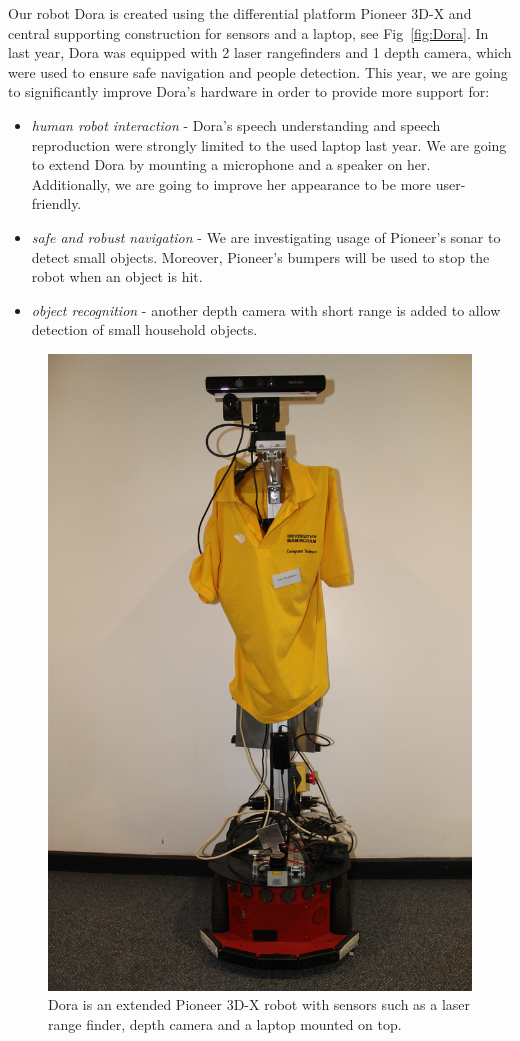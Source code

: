 Our robot Dora is created using the differential platform Pioneer 3D-X and central supporting construction for sensors and a laptop, see Fig~\ref{fig:Dora}. 
In last year, Dora was equipped with 2 laser rangefinders and 1 depth camera, which were used to ensure safe navigation 
and people detection. 
This year, we are going to significantly improve Dora's hardware in order to provide more support for:
\begin{itemize}
\item \textit{human robot interaction} - Dora's speech understanding and speech reproduction were strongly limited to the used laptop last year. 
We are going to extend Dora by mounting a microphone and a speaker on her. Additionally, we are going to improve her appearance to be more user-friendly. 
\item \textit{safe and robust navigation} - We are investigating usage of Pioneer's sonar to detect small objects. 
Moreover, Pioneer's bumpers will be used to stop the robot when an object is hit. 
\item \textit{object recognition} - another depth camera with short range is added to allow detection of small household objects.
\end{itemize}
 
\begin{figure}[!htb]
\centering
\includegraphics[width=2.in]{dora_new.png}
\caption{Dora is an extended Pioneer 3D-X robot with sensors such as a laser range finder, depth camera and a laptop mounted on top.}
\label{fig:dora}
\end{figure}  


